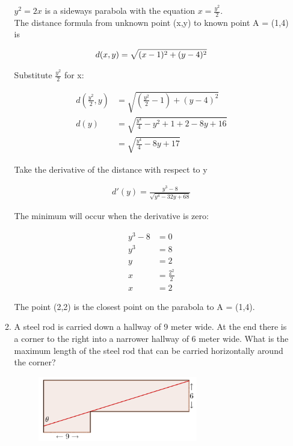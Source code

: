 \documentclass[a4paper]{article}
\begin{document}
\begin{enumerate}
\begin{enumerate}
$y^2 = 2x$ is a sideways parabola with the equation $x = \frac{y^2}{2}$.\\
The distance formula from unknown point (x,y) to known point A = (1,4) is

\begin{align*}
	d(x,y) = \sqrt{(x-1)^2 + (y - 4)^2} \notag
\end{align*}	

Substitute $\frac{y^2}{2}$ for x:

\begin{align*}
d(\frac{y^2}{2},y) &= \sqrt{(\frac{y^2}{2} - 1) + (y - 4)^2}\\
d(y) &= \sqrt{\frac{y^4}{4} - y^2 + 1 + 2 - 8y + 16}\\
&= \sqrt{\frac{y^4}{4} - 8y + 17}
\end{align*}	

Take the derivative of the distance with respect to y

\begin{align*}
d'(y) = \frac{y^3 - 8}{\sqrt{y^4 - 32y + 68}}
\end{align*}

The minimum will occur when the derivative is zero:

\begin{align*}
	y^3 - 8 &= 0\\
	y^3 &= 8 \\
	y &= 2\\
	x &= \frac{2^2}{2}\\
	x &= 2
\end{align*}

The point (2,2) is the closest point on the parabola to A = (1,4).\\	
	
	\item A steel rod is carried down a hallway of 9 meter wide. At the end there is a corner to the right into a narrower hallway of 6 meter wide. What is the maximum length of the steel rod that can be carried horizontally around the corner?
	
	\begin{figure}[ht!]
	\centering
  \includegraphics[width=0.7\textwidth]{images/task3.PNG}
\end{figure}	
	

\end{enumerate}
\end{enumerate}
\end{document}
